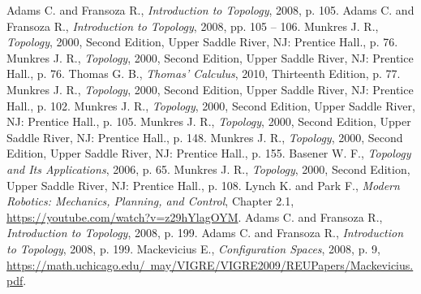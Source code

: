 \documentclass[12pt]{article}
\theoremstyle{definition}
\begin{document}
\begin{center}
\begin{thebibliography}{00}
     Adams C. and Fransoza R., \textit{Introduction to Topology}, 2008, p. 105.
     Adams C. and Fransoza R., \textit{Introduction to Topology}, 2008, pp. 105 -- 106.
     Munkres J. R., \textit{Topology}, 2000, Second Edition, Upper Saddle River, NJ: Prentice Hall., p. 76.
     Munkres J. R., \textit{Topology}, 2000, Second Edition, Upper Saddle River, NJ: Prentice Hall., p. 76.
     Thomas G. B., \textit{Thomas' Calculus}, 2010, Thirteenth Edition, p. 77.
     Munkres J. R., \textit{Topology}, 2000, Second Edition, Upper Saddle River, NJ: Prentice Hall., p. 102.
     Munkres J. R., \textit{Topology}, 2000, Second Edition, Upper Saddle River, NJ: Prentice Hall., p. 105.
     Munkres J. R., \textit{Topology}, 2000, Second Edition, Upper Saddle River, NJ: Prentice Hall., p. 148.
     Munkres J. R., \textit{Topology}, 2000, Second Edition, Upper Saddle River, NJ: Prentice Hall., p. 155.
     Basener W. F., \textit{Topology and Its Applications}, 2006, p. 65.
     Munkres J. R., \textit{Topology}, 2000, Second Edition, Upper Saddle River, NJ: Prentice Hall., p. 108.
     Lynch K. and Park F., \textit{Modern Robotics: Mechanics, Planning, and Control}, Chapter 2.1, \href{https://youtube.com/watch?v=z29hYlagOYM}{https://youtube.com/watch?v=z29hYlagOYM}.
     Adams C. and Fransoza R., \textit{Introduction to Topology}, 2008, p. 199.
     Adams C. and Fransoza R., \textit{Introduction to Topology}, 2008, p. 199.
     Mackevicius E., \textit{Configuration Spaces}, 2008, p. 9,\\\href{https://math.uchicago.edu/~may/VIGRE/VIGRE2009/REUPapers/Mackevicius.pdf}{https://math.uchicago.edu/~may/VIGRE/VIGRE2009/REUPapers/Mackevicius.pdf}.
\end{thebibliography}
\end{center}
\end{document}
